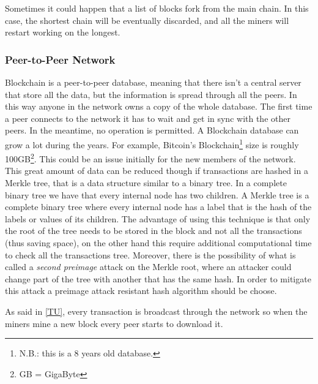 \label{fork}
Sometimes it could happen that a list of blocks fork from the main chain. In
this case, the shortest chain will be eventually discarded, and all the miners
will restart working on the longest\cite{sok15}.

\subsubsection{Peer-to-Peer Network}

Blockchain is a peer-to-peer database, meaning that there isn't a central
server that store all the data, but the information is spread through all the
peers.
In this way anyone in the network owns a copy of the whole database. The first
time a peer connects to the network it has to wait and get in sync with the
other peers. In the meantime, no operation is permitted. A Blockchain database
can grow a lot during the years. For example, Bitcoin's
Blockchain\footnote{N.B.: this is a 8 years old database.} size is roughly
100GB\footnote{GB = GigaByte}. This could be an issue initially for the new
members of the network.
This great amount of data can be reduced though if transactions are hashed in a
Merkle tree, that is a data structure similar to a binary tree. In a complete
binary tree we have that every internal node has two children. A Merkle tree is
a complete binary tree where every internal node has a label that is the hash
of the labels or values of its children\cite{szydlo04}. The advantage of using
this technique is that only the root of the tree needs to be stored in the
block and not all the transactions\cite{nakamoto08} (thus saving space), on the
other hand this require additional computational time to check all the
transactions tree. Moreover, there is the possibility of what is called a
\textit{second preimage} attack on the Merkle root, where an attacker could
change part of the tree with another that has the same hash\cite{rogaway04}. In
order to mitigate this attack a preimage attack resistant hash algorithm should
be choose.


As said in \ref{TU}, every transaction is broadcast through the network so when
the miners mine a new block every peer starts to download it.

